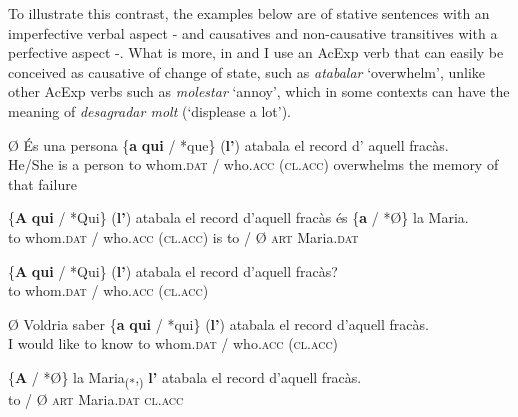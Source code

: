 \documentclass[output=paper,colorlinks,citecolor=brown,nonflat,modfonts]{langsci/langscibook}
\begin{document}
To illustrate this contrast, the examples below are of stative sentences with an imperfective verbal aspect - and causatives and non-causative transitives with a perfective aspect -. What is more, in  and  I use an AcExp verb that can easily be conceived as causative of change of state, such as \textit{atabalar} ‘overwhelm’, unlike other AcExp verbs such as \textit{molestar} ‘annoy’, which in some contexts can have the meaning of  \textit{desagradar molt} (‘displease a lot’).

\ea%
 \label{ex:royo:14}
 \ea \label{ex:royo:14a}
 \gll Ø És una persona \{\textbf{a} \textbf{qui} / *que\} (\textbf{l’}) atabala el record d’ aquell fracàs.\\
  He/She is a person to whom.\textsc{dat} / who.\textsc{acc} (\textsc{cl.acc}) overwhelms the memory of that failure \\
\glt {}
 
 \ex \label{ex:royo:14b}
 \gll \{\textbf{A} \textbf{qui} / *Qui\} (\textbf{l’}) atabala el record d’aquell fracàs és \{\textbf{a} / *Ø\} la Maria.\\
 to whom.\textsc{dat} / who.\textsc{acc} (\textsc{cl.acc}) is to / Ø \textsc{art} Maria.\textsc{dat} \\
\glt {}
 
 \ex \label{ex:royo:14c}
 \gll \{\textbf{A} \textbf{qui} / *Qui\} (\textbf{l’}) atabala el record d’aquell fracàs?\\
 to whom.\textsc{dat} / who.\textsc{acc} (\textsc{cl.acc}) \\
\glt {}
 
 \ex \label{ex:royo:14d}
 \gll Ø Voldria saber \{\textbf{a} \textbf{qui} / *qui\} (\textbf{l’}) atabala el record d’aquell fracàs.\\
 I would like to know to whom.\textsc{dat} / who.\textsc{acc} (\textsc{cl.acc}) \\
\glt {}
 
 \ex \label{ex:royo:14e}
 \gll \{\textbf{A} / *Ø\} la Maria\textsubscript{(*},\textsubscript{)} \textbf{l’} atabala el record d’aquell fracàs.\\
 to / Ø \textsc{art} Maria.\textsc{dat} \textsc{cl.acc} \\
\glt {}
 
 
 \z
 \z
 
\end{document}
